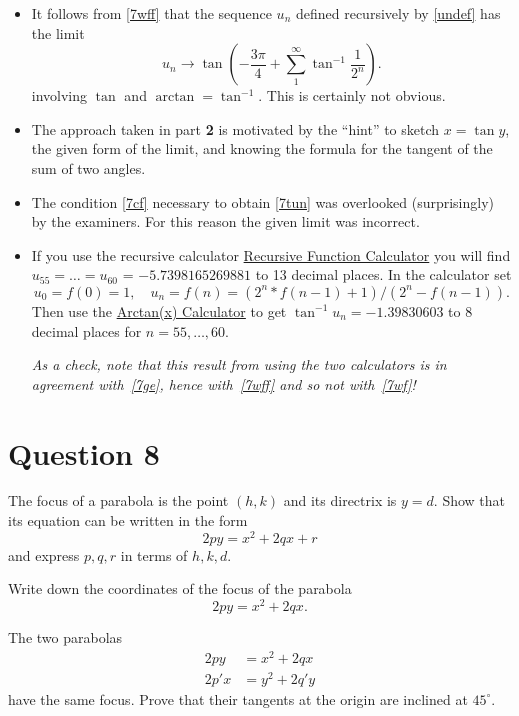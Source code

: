 \documentclass[11pt,a4paper]{report}
\theoremstyle{plain}
\theoremstyle{definition}
\begin{document}
\begin{itemize} [nosep]
\item It follows from \eqref{7wff} that the sequence $ u_n $ defined recursively by \eqref{undef} has the limit
\[    
u_n \to \tan \left( -\dfrac{3\pi}{4} + \sum_1^\infty \tan^{-1} \dfrac{1}{2^n}\right).
\]
involving $ \tan $ and $ \arctan = \tan^{-1} $. This is certainly not obvious.

\item The approach taken in part \textbf{2} is motivated by the ``hint'' to sketch $ x=\tan y $, the given form of the limit, and knowing   the formula for the tangent of the sum of two angles.

\item The condition \eqref{7cf}  necessary to obtain \eqref{7tun} was overlooked (surprisingly) by the examiners.  For this reason the given limit was incorrect.

\item If you use the recursive calculator \href{http://www.calcul.com/show/calculator/recursive?}{Recursive Function Calculator} you will find 
$ u_{55} = \dots = u_{60} $ = $  -5.7398165269881$ to 13 decimal     places.  In the calculator  set
\[
u_0 = f(0) = 1, \quad u_n = f(n) = (2^n*f(n-1) +1)/(2^n-f(n-1)).
\]
Then use the \href{https://www.rapidtables.com/calc/math/Arctan_Calculator.html}{Arctan(x) Calculator} to  get $ \tan^{-1} u_n =  -1.39830603 $  to 8 decimal places for $ n=55,\dots, 60 $.

\medskip
\emph{As a check, note that this result from using the two calculators is in agreement with~\eqref{7ge}, hence with~\eqref{7wff} and so not with~\eqref{7wf}!}


\end{itemize} 


\newpage
\section*{Question 8} 


The focus of a parabola is the point $ (h,k) $ and its directrix is $ y = d $. Show that its equation can be written in the form 
\[
2py = x^2 + 2qx + r 
\]
and express $ p, q, r $ in terms of $ h, k, d $.

Write down the coordinates of the focus of the parabola
\[ 2py = x^2 + 2qx.\]

The two parabolas 
\begin{align*}
2py &= x^2 + 2qx \\
2p'x &= y^2 + 2q'y
\end{align*}
have the same focus.  Prove that their tangents at the origin are inclined at $ 45^\circ $. 
\end{document}
